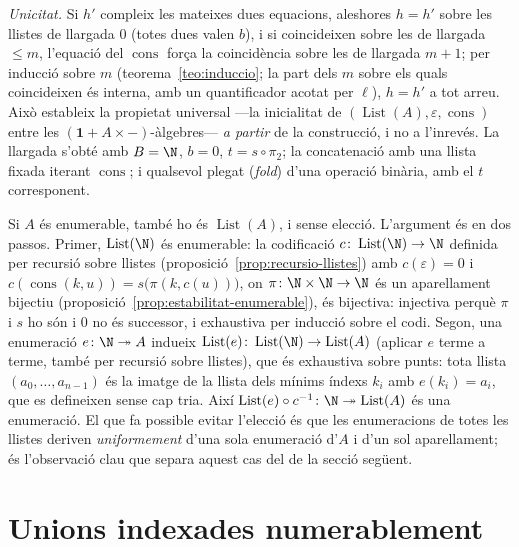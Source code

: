 \begin{prova}
\emph{Unicitat.} Si \(h'\) compleix les mateixes dues equacions, aleshores
\(h=h'\) sobre les llistes de llargada \(0\) (totes dues valen \(b\)), i si
coincideixen sobre les de llargada \(\le m\), l'equació del
\(\operatorname{cons}\) força la coincidència sobre les de llargada \(m+1\);
per inducció sobre \(m\) (teorema~\ref{teo:induccio}; la part dels \(m\)
sobre els quals coincideixen és interna, amb un quantificador acotat per
\(\ell\)), \(h=h'\) a tot arreu.
Això estableix la propietat universal ---la inicialitat de
\((\operatorname{List}(A),\varepsilon,\operatorname{cons})\) entre les
\((\mathbf1+A\times{-})\)-àlgebres--- \emph{a partir} de la construcció, i
no a l'inrevés. La llargada s'obté amb \(B=\N\), \(b=0\), \(t=s\circ\pi_2\);
la concatenació amb una llista fixada iterant \(\operatorname{cons}\); i
qualsevol plegat (\emph{fold}) d'una operació binària, amb el \(t\)
corresponent.
\end{prova}

\begin{observacio}\label{obs:llistes-enumerables}
Si \(A\) és enumerable, també ho és \(\operatorname{List}(A)\), i sense
elecció. L'argument és en dos passos. Primer, \(\operatorname{List}(\N)\)
és enumerable: la codificació
\(c\colon\operatorname{List}(\N)\to\N\) definida per recursió sobre llistes
(proposició~\ref{prop:recursio-llistes}) amb \(c(\varepsilon)=0\) i
\(c(\operatorname{cons}(k,u))=s\bigl(\pi(k,c(u))\bigr)\), on
\(\pi\colon\N\times\N\to\N\) és un aparellament bijectiu
(proposició~\ref{prop:estabilitat-enumerable}), és bijectiva: injectiva
perquè \(\pi\) i \(s\) ho són i \(0\) no és successor, i exhaustiva per
inducció sobre el codi. Segon, una enumeració \(e\colon\N\twoheadrightarrow A\)
indueix \(\operatorname{List}(e)\colon\operatorname{List}(\N)\to\operatorname{List}(A)\)
(aplicar \(e\) terme a terme, també per recursió sobre llistes), que és
exhaustiva sobre punts: tota llista \((a_0,\dots,a_{n-1})\) és la imatge
de la llista dels mínims índexs \(k_i\) amb \(e(k_i)=a_i\), que es
defineixen sense cap tria. Així
\(\operatorname{List}(e)\circ c^{-1}\colon\N\twoheadrightarrow\operatorname{List}(A)\)
és una enumeració. El que fa possible evitar l'elecció és que les
enumeracions de totes les llistes deriven \emph{uniformement} d'una sola
enumeració d'\(A\) i d'un sol aparellament; és l'observació clau que
separa aquest cas del de la secció següent.
\end{observacio}

\section{Unions indexades numerablement}\label{sec:unions-numerables}

